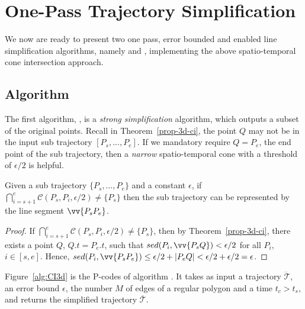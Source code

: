 



\section{One-Pass Trajectory Simplification}
We now are ready to present two one pass, error bounded and \sed enabled line simplification algorithms, namely \cist and \cista, implementing the above spatio-temporal cone intersection approach.





\subsection{{Algorithm \cist}}
The first algorithm, \cist, is a \emph{strong simplification}\cite{Trajcevski:DDR} algorithm, which outputs a subset of the original points.
Recall in Theorem~\ref{prop-3d-ci}, the point $Q$ may not be in the input sub trajectory $[P_s,...,P_e]$.
If we mandatory require $Q=P_e$, the end point of the sub trajectory, then a \emph{narrow} spatio-temporal cone with a threshold of $\epsilon/2$ is helpful.

\begin{theorem}
\label{prop-3d-ci-half}
Given a sub trajectory $\{P_s, \ldots, P_e\}$ and a constant $\epsilon$, if $\bigcap_{i=s+1}^{e}{\mathcal{C}(P_s, P_i, \epsilon/2)} \ne \{P_s\}$ then the sub trajectory can be represented by the line segment $\vv{P_sP_e}$.
\end{theorem}

\begin{proof}
If $\bigcap_{i=s+1}^{e}{\mathcal{C}(P_s, P_i, \epsilon/2)} \ne \{P_s\}$, then by Theorem~\ref{prop-3d-ci}, there exists a point $Q$, $Q.t = P_e.t$, such that $sed(P_i, \vv{P_sQ})<\epsilon/2$ for all $P_i$, $i \in [s,e]$. Hence, $sed(P_i, \vv{P_sP_e})\le \epsilon/2 + |P_eQ| < \epsilon/2 + \epsilon/2 = \epsilon$.
\end{proof}



Figure~\ref{alg:CI3d} is the P-codes of algorithm \cist. It takes as input a trajectory $\dddot{\mathcal{T}}$, an error bound $\epsilon$, the number $M$ of edges of a regular polygon and a time $t_c>t_s$, and returns the simplified trajectory $\overline{\mathcal{T}}$.

